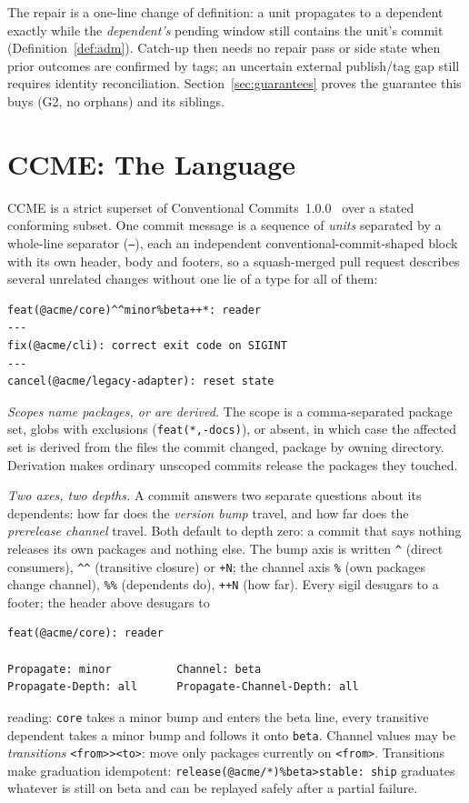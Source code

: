 \documentclass[sigconf,nonacm]{acmart}
\newcommand{\code}[1]{\texttt{#1}}
\newcommand{\G}[1]{G#1}
\begin{document}
The repair is a one-line change of definition: a unit propagates to a
dependent exactly while the \emph{dependent's} pending window still
contains the unit's commit (Definition~\ref{def:adm}). Catch-up then
needs no repair pass or side state when prior outcomes are confirmed by tags;
an uncertain external publish/tag gap still requires identity reconciliation.
Section~\ref{sec:guarantees} proves the guarantee this buys (\G{2}, no
orphans) and its siblings.

\section{CCME: The Language}
\label{sec:ccme}

CCME is a strict superset of Conventional Commits~1.0.0~\cite{cc} over a
stated conforming subset. One commit message is a sequence of
\emph{units} separated by a whole-line separator (\code{---}), each an
independent conventional-commit-shaped block with its own header, body
and footers, so a squash-merged pull request describes several unrelated
changes without one lie of a type for all of them:

\begin{small}
\begin{verbatim}
feat(@acme/core)^^minor%beta++*: reader
---
fix(@acme/cli): correct exit code on SIGINT
---
cancel(@acme/legacy-adapter): reset state
\end{verbatim}
\end{small}

\emph{Scopes name packages, or are derived.} The scope is a
comma-separated package set, globs with exclusions
(\code{feat(*,-docs)}), or absent, in which case the affected set is
derived from the files the commit changed, package by owning directory.
Derivation makes ordinary unscoped commits release the packages they touched.

\emph{Two axes, two depths.} A commit answers two separate questions
about its dependents: how far does the \emph{version bump} travel, and
how far does the \emph{prerelease channel} travel. Both default to depth
zero: a commit that says nothing releases its own packages and nothing
else. The bump axis is written \code{\^{}} (direct consumers),
\code{\^{}\^{}} (transitive closure) or \code{+N}; the channel axis
\code{\%} (own packages change channel), \code{\%\%} (dependents do),
\code{++N} (how far). Every sigil desugars to a footer; the header above
desugars to
\begin{small}
\begin{verbatim}
feat(@acme/core): reader

Propagate: minor          Channel: beta
Propagate-Depth: all      Propagate-Channel-Depth: all
\end{verbatim}
\end{small}
reading: \code{core} takes a minor bump and enters the beta line, every
transitive dependent takes a minor bump and follows it onto \code{beta}.
Channel values may be \emph{transitions} \code{<from>><to>}: move only
packages currently on \code{<from>}. Transitions make graduation
idempotent: \code{release(@acme/*)\%beta>stable:~ship} graduates
whatever is still on beta and can be replayed safely after a partial
failure.
\end{document}
